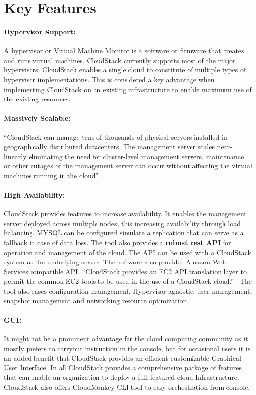 \section{Key Features}

\paragraph{Hypervisor Support:} A hypervisor or Virtual Machine
Monitor is a software or firmware that creates and runs virtual
machines. CloudStack currently supports most of the major hypervisors.
CloudStack enables a single cloud to constitute of multiple types of
hypervisor implementations. This is considered a key advantage when
implementing CloudStack on an existing infrastructure to enable
maximum use of the existing resources. 

\paragraph{Massively Scalable:}
``CloudStack can manage tens of thousands of physical servers installed
in geographically distributed datacenters. The management server
scales near-linearly eliminating the need for cluster-level management
servers. maintenance or other outages of the management server can
occur without affecting the virtual machines running in the cloud''~\cite{hid-sp18-417-www-cloudstack-scalability}.

\paragraph{High Availability:} CloudStack provides features to
increase availability. It enables the management server deployed
across multiple nodes, this increasing availability through load
balancing. MYSQL can be configured simulate a replication that can
serve as a fallback in case of data loss. The tool also provides a
{\bf robust rest API} for operation and management of the cloud. The
API can be used with a CloudStack system as the underlying server.
The software also provides Amazon Web Services compatible
API. ``CloudStack provides an EC2 API translation layer to permit the
common EC2 tools to be used in the use of a CloudStack
cloud.''~\cite{hid-sp18-417-www-cloudstack-aws} The tool also eases
configuration management, Hypervisor agnostic, user management,
snapshot management and networking resource optimization.

\paragraph{GUI:} It might not be a prominent advantage for the cloud
computing community as it mostly prefers to carryout instruction in
the console, but for occasional users it is an added benefit that
CloudStack provides an efficient customizable Graphical User
Interface. In all CloudStack provides a comprehensive package of
features that can enable an organization to deploy a full featured
cloud Infrastructure. CloudStack also offers CloudMonkey CLI 
tool to easy orchestration from console.

